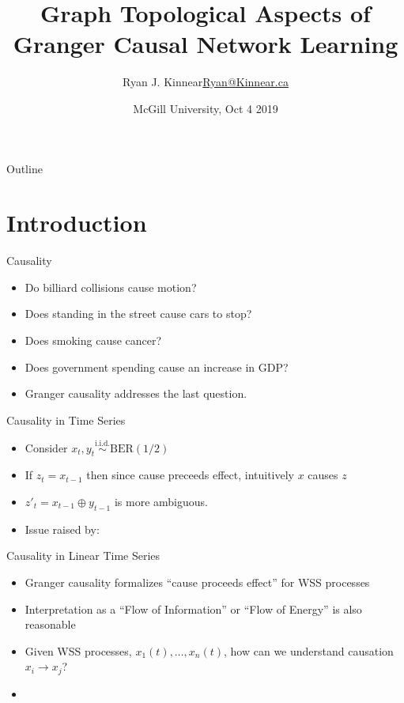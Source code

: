 \documentclass{beamer} %
\title{Graph Topological Aspects of Granger Causal Network Learning}
\author{\texorpdfstring{Ryan J. Kinnear\newline\url{Ryan@Kinnear.ca}}{Ryan J. Kinnear}}%
\institute[University of Waterloo] %
{
  University of Waterloo\\
  Department of Electrical and Computer Engineering
}
\date{McGill University, Oct 4 2019}
\begin{document}
\begin{frame}
  \titlepage
\end{frame}

\begin{frame}{Outline}
  \tableofcontents
\end{frame}

\section{Introduction}

\begin{frame}{Causality}
  \begin{itemize}
    \item{Do billiard collisions cause motion?}\pause
    \item{Does standing in the street cause cars to stop?}\pause
    \item{Does smoking cause cancer?}\pause
    \item{Does government spending cause an increase in GDP?}\pause
    \item{Granger causality addresses the last question.}
  \end{itemize}
\end{frame}

\begin{frame}{Causality in Time Series}
  \begin{itemize}
    \item{Consider $x_t, y_t \overset{\text{i.i.d.}}{\sim} \text{BER}(1/2)$}\pause
    \item{If $z_t = x_{t - 1}$ then since cause preceeds effect, intuitively $x$ causes $z$}\pause
    \item{$z'_t = x_{t - 1} \oplus y_{t - 1}$ is more ambiguous.}\pause
    \item{Issue raised by: } 
  \end{itemize}
\end{frame}

\begin{frame}{Causality in Linear Time Series}
  \begin{itemize}
    \item{Granger causality formalizes ``cause proceeds effect'' for WSS processes}\pause
    \item{Interpretation as a ``Flow of Information'' or ``Flow of Energy'' is also reasonable}\pause
    \item{Given WSS processes, $x_1(t), \ldots, x_n(t)$, how can we understand causation $x_i \rightarrow x_j$?}\pause
    \item{}
  \end{itemize}
\end{frame}
\end{document}
